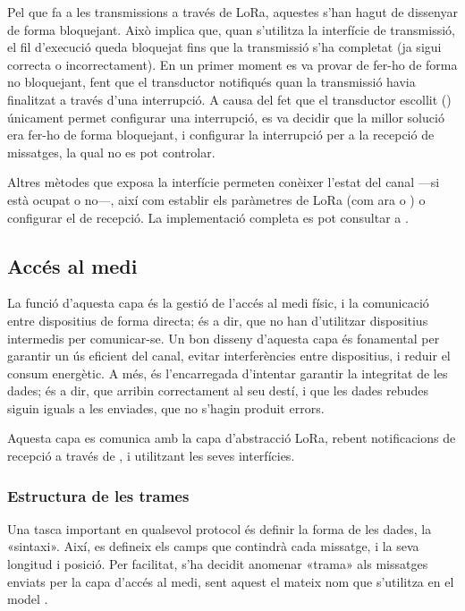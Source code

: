 \documentclass{tfgitic}[2024/07/01]
\begin{document}
Pel que fa a les transmissions a través de LoRa, aquestes s'han hagut de dissenyar de forma bloquejant. Això implica que, quan s'utilitza la interfície de transmissió, el fil d'execució queda bloquejat fins que la transmissió s'ha completat (ja sigui correcta o incorrectament). En un primer moment es va provar de fer-ho de forma no bloquejant, fent que el transductor notifiqués quan la transmissió havia finalitzat a través d'una interrupció. A causa del fet que el transductor escollit () únicament permet configurar una interrupció, es va decidir que la millor solució era fer-ho de forma bloquejant, i configurar la interrupció per a la recepció de missatges, la qual no es pot controlar.

Altres mètodes que exposa la interfície permeten conèixer l'estat del canal ---si està ocupat o no---, així com establir els paràmetres de LoRa (com ara  o ) o configurar el  de recepció. La implementació completa es pot consultar a .

\subsection{Accés al medi}
La funció d'aquesta capa és la gestió de l'accés al medi físic, i la comunicació entre dispositius de forma directa; és a dir, que no han d'utilitzar dispositius intermedis per comunicar-se. Un bon disseny d'aquesta capa és fonamental per garantir un ús eficient del canal, evitar interferències entre dispositius, i reduir el consum energètic. A més, és l'encarregada d'intentar garantir la integritat de les dades; és a dir, que arribin correctament al seu destí, i que les dades rebudes siguin iguals a les enviades, que no s'hagin produit errors. 

Aquesta capa es comunica amb la capa d'abstracció LoRa, rebent notificacions de recepció a través de , i utilitzant les seves interfícies.

\subsubsection{Estructura de les trames}
Una tasca important en qualsevol protocol és definir la forma de les dades, la «sintaxi». Així, es defineix els camps que contindrà cada missatge, i la seva longitud i posició. Per facilitat, s'ha decidit anomenar «trama» als missatges enviats per la capa d'accés al medi, sent aquest el mateix nom que s'utilitza en el model .
\end{document}
